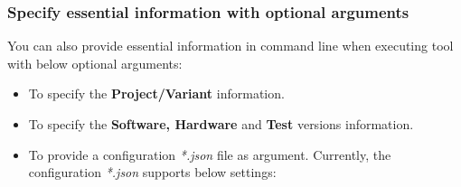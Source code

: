   \hypertarget{optional-arguments}{%
  \subsubsection{Specify essential information with optional arguments}
  \label{optional-arguments}}
    You can also provide essential information in command line when executing
    \pkg tool with below optional arguments:

      \begin{itemize}
        \item {}
          To specify the \textbf{Project/Variant} information.

        \item {}
          To specify the \textbf{Software, Hardware} and \textbf{Test} versions
          information.

        \item {}
          To provide a configuration \emph{*.json} file as  argument.
          Currently, the configuration \emph{*.json} supports below settings:


\end{itemize}
